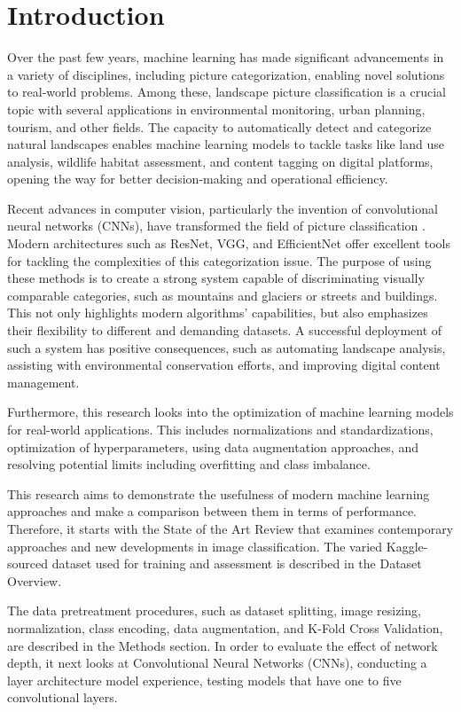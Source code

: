 \documentclass[conference]{IEEEtran}
\begin{document}
\section{Introduction}
Over the past few years, machine learning has made significant advancements in a variety of disciplines, including picture categorization, enabling novel solutions to real-world problems. Among these, landscape picture classification is a crucial topic with several applications in environmental monitoring, urban planning, tourism, and other fields. The capacity to automatically detect and categorize natural landscapes enables machine learning models to tackle tasks like land use analysis, wildlife habitat assessment, and content tagging on digital platforms, opening the way for better decision-making and operational efficiency.

Recent advances in computer vision, particularly the invention of convolutional neural networks (CNNs), have transformed the field of picture classification \cite{kri2017}. Modern architectures such as ResNet, VGG, and EfficientNet offer excellent tools for tackling the complexities of this categorization issue. The purpose of using these methods is to create a strong system capable of discriminating visually comparable categories, such as mountains and glaciers or streets and buildings. This not only highlights modern algorithms' capabilities, but also emphasizes their flexibility to different and demanding datasets. A successful deployment of such a system has positive consequences, such as automating landscape analysis, assisting with environmental conservation efforts, and improving digital content management.

Furthermore, this research looks into the optimization of machine learning models for real-world applications. This includes normalizations and standardizations, optimization of hyperparameters, using data augmentation approaches, and resolving potential limits including overfitting and class imbalance. 

This research aims to demonstrate the usefulness of modern machine learning approaches and make a comparison between them in terms of performance. Therefore, it starts with the State of the Art Review that examines contemporary approaches and new developments in image classification. The varied Kaggle-sourced dataset used for training and assessment is described in the Dataset Overview.

The data pretreatment procedures, such as dataset splitting, image resizing, normalization, class encoding, data augmentation, and K-Fold Cross Validation, are described in the Methods section. In order to evaluate the effect of network depth, it next looks at Convolutional Neural Networks (CNNs), conducting a layer architecture model experience, testing models that have one to five convolutional layers.
\end{document}
